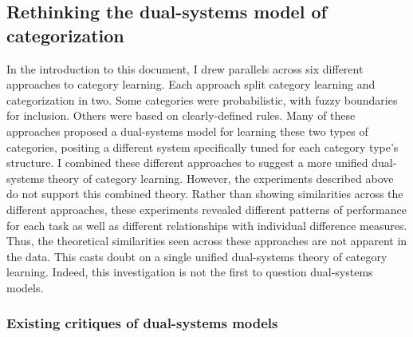 \documentclass[../dissertation.tex]{subfiles}
\begin{document}
\subsection{Rethinking the dual-systems model of categorization}

	In the introduction to this document, I drew parallels across six different approaches to category learning. Each approach split category learning and categorization in two. Some categories were probabilistic, with fuzzy boundaries for inclusion. Others were based on clearly-defined rules. Many of these approaches proposed a dual-systems model for learning these two types of categories, positing a different system specifically tuned for each category type's structure. I combined these different approaches to suggest a more unified dual-systems theory of category learning. However, the experiments described above do not support this combined theory. Rather than showing similarities across the different approaches, these experiments revealed different patterns of performance for each task as well as different relationships with individual difference measures. Thus, the theoretical similarities seen across these approaches are not apparent in the data. This casts doubt on a single unified dual-systems theory of category learning. Indeed, this investigation is not the first to question dual-systems models.

\subsubsection{Existing critiques of dual-systems models}
\end{document}
